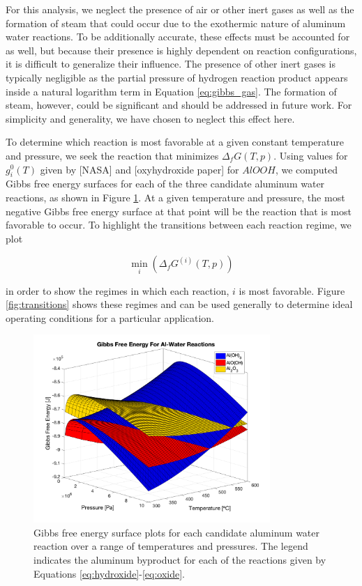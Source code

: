 \documentclass[preprint,12pt,3p]{elsarticle}
\begin{document}
For this analysis, we neglect the presence of air or other inert gases as well
as the formation of steam that could occur due to the exothermic nature of
aluminum water reactions. To be additionally accurate, these effects must be
accounted for as well, but because their presence is highly dependent on
reaction configurations, it is difficult to generalize their influence. The
presence of other inert gases is typically negligible as the partial pressure of
hydrogen reaction product appears inside a natural logarithm term in Equation
\ref{eq:gibbs_gas}. The formation of steam, however, could be significant and
should be addressed in future work. For simplicity and generality, we have
chosen to neglect this effect here.

To determine which reaction is most favorable at a given constant temperature
and pressure, we seek the reaction that minimizes $\Delta_f G(T,p)$. Using
values for $g_i^0(T)$ given by [NASA] and [oxyhydroxide paper] for $AlOOH$, we
computed Gibbs free energy surfaces for each of the three candidate aluminum
water reactions, as shown in Figure \ref{fig:gibbs_surface}. At a given
temperature and pressure, the most negative Gibbs free energy surface at that
point will be the reaction that is most favorable to occur. To highlight the
transitions between each reaction regime, we plot

\begin{equation}
  \min_i(\Delta_fG^{(i)}(T,p))
  \label{eq:min_gibbs}
\end{equation}

\noindent in order to show the regimes in which each reaction, $i$ is most
favorable.  Figure \ref{fig:transitions} shows these regimes and can be used
generally to determine ideal operating conditions for a particular application.

\begin{figure}
  \centering
  \includegraphics[width=0.8\textwidth]{fig/gibbs_total_surface}
  \caption{Gibbs free energy surface plots for each candidate aluminum water
  reaction over a range of temperatures and pressures. The legend indicates the
  aluminum byproduct for each of the reactions given by Equations
\ref{eq:hydroxide}-\ref{eq:oxide}.}
  \label{fig:gibbs_surface}
\end{figure}
\end{document}
